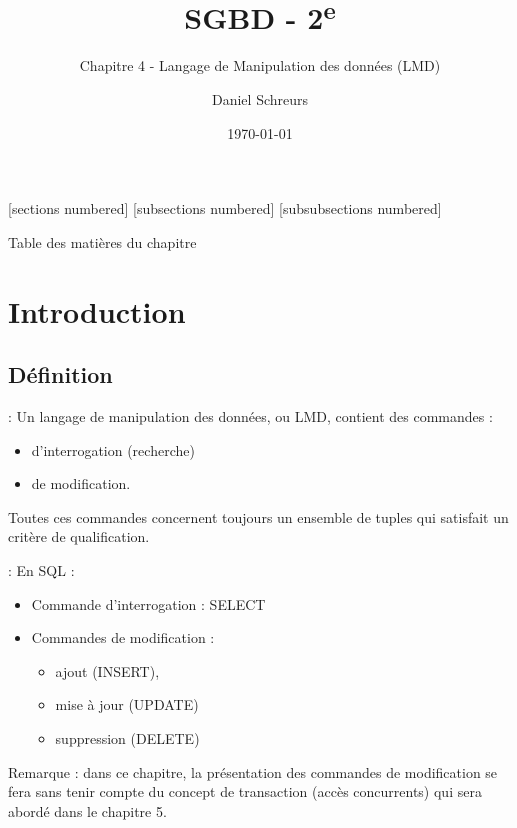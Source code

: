 \documentclass[10pt]{beamer}
\title{SGBD - 2\textsuperscript{e}}
\subtitle{Chapitre 4 - Langage de Manipulation des données (LMD)}
\date{\today}
\author{Daniel Schreurs}
\institute{Haute École de Province de Liège}
\begin{document}
\maketitle

[sections numbered]
[subsections numbered]
[subsubsections numbered]
\begin{frame}[allowframebreaks]{Table des matières du chapitre}
    \tableofcontents[subsectionstyle=show/show/hide,subsubsectionstyle=show/show/hide,]
\end{frame}

\section{Introduction}
\tocss
\subsection{Définition}
\begin{frame}{\secname : \subsecname}
    Un langage de manipulation des données, ou LMD, contient des commandes :
    \begin{itemize}
        \item d'interrogation (recherche)
        \item de modification.
    \end{itemize}
    Toutes ces commandes concernent toujours un ensemble de tuples qui satisfait un critère de qualification.
\end{frame}

\begin{frame}{\secname : \subsecname}
    En SQL :
    \begin{itemize}
        \item Commande d'interrogation : SELECT
        \item Commandes de modification :
              \begin{itemize}
                  \item ajout (INSERT),
                  \item mise à jour (UPDATE)
                  \item suppression (DELETE)
              \end{itemize}
    \end{itemize}
    Remarque : dans ce chapitre, la présentation des commandes de modification se fera sans tenir compte du concept de transaction (accès concurrents) qui sera abordé dans le chapitre 5.
\end{frame}
\end{document}
